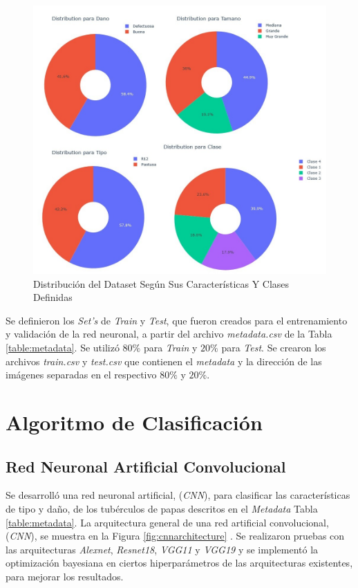 	\begin{figure}[ht]
		\centering
		\includegraphics[scale=0.4]{Figs/Distribucion.jpg}
		\caption{Distribución del Dataset Según Sus Características Y Clases Definidas}
		\label{fig:distribuciontipo}
	\end{figure}

	Se definieron los \textit{Set's} de \textit{Train} y \textit{Test}, que fueron creados para el entrenamiento y validación de la red neuronal, a partir del archivo \textit{metadata.csv} de la Tabla \ref{table:metadata}. Se utilizó $80\%$ para \textit{Train} y $20\%$ para \textit{Test}. Se crearon los archivos \textit{train.csv} y \textit{test.csv} que contienen el \textit{metadata} y la dirección de las imágenes separadas en el respectivo $80\%$ y $20\%$.



\newpage
\chapter{Algoritmo de Clasificación}

	\section{Red Neuronal Artificial Convolucional}

	Se desarrolló una red neuronal artificial, (\textit{CNN}), para clasificar las características de tipo y daño, de los tubérculos de papas descritos en el \textit{Metadata} Tabla \ref{table:metadata}. La arquitectura general de una red artificial convolucional, (\textit{CNN}), se muestra en la Figura \ref{fig:cnnarchitecture} \cite{cnnarchitecture}. Se realizaron pruebas con las arquitecturas \textit{Alexnet}, \textit{Resnet18}, \textit{VGG11} y \textit{VGG19} y se implementó la optimización bayesiana en ciertos hiperparámetros de las arquitecturas existentes, para mejorar los resultados. 
	
